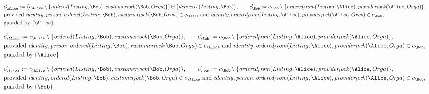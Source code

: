 \begin{align*}
&
c'_
{
\Alice
}
 := 
(c_
{
\Alice
}
 \setminus 
\{
\mathit{
ordered
}
(
Listing
,
\Bob
)
,
\mathit{
customer_lock
}
(
\Bob
,
Orga
)
\}
) \uplus 
\{
\mathit{
delivered
}
(
Listing
,
\Bob
)
\}
, \qquad 
c'_
{
\Bob
}
 := 
c_
{
\Bob
}
 \setminus 
\{
\mathit{
ordered_from
}
(
Listing
,
\Alice
)
,
\mathit{
provider_lock
}
(
\Alice
,
Orga
)
\}
,\\
&
\text{provided } 
\mathit{
identity
}
,
\mathit{
person
}
,
\mathit{
ordered
}
(
Listing
,
\Bob
)
,
\mathit{
customer_lock
}
(
\Bob
,
Orga
)
 \in c_
{
\Alice
}
 \text{ and } 
\mathit{
identity
}
,
\mathit{
ordered_from
}
(
Listing
,
\Alice
)
,
\mathit{
provider_lock
}
(
\Alice
,
Orga
)
 \in c_
{
\Bob
}
,\\
&
\text{guarded by } \{
\Alice
\}
\end{align*}

\begin{align*}
&
c'_
{
\Alice
}
 := 
c_
{
\Alice
}
 \setminus 
\{
\mathit{
ordered
}
(
Listing
,
\Bob
)
,
\mathit{
customer_lock
}
(
\Bob
,
Orga
)
\}
, \qquad 
c'_
{
\Bob
}
 := 
c_
{
\Bob
}
 \setminus 
\{
\mathit{
ordered_from
}
(
Listing
,
\Alice
)
,
\mathit{
provider_lock
}
(
\Alice
,
Orga
)
\}
,\\
&
\text{provided } 
\mathit{
identity
}
,
\mathit{
person
}
,
\mathit{
ordered
}
(
Listing
,
\Bob
)
,
\mathit{
customer_lock
}
(
\Bob
,
Orga
)
 \in c_
{
\Alice
}
 \text{ and } 
\mathit{
identity
}
,
\mathit{
ordered_from
}
(
Listing
,
\Alice
)
,
\mathit{
provider_lock
}
(
\Alice
,
Orga
)
 \in c_
{
\Bob
}
,\\
&
\text{guarded by } \{
\Alice
\}
\end{align*}

\begin{align*}
&
c'_
{
\Alice
}
 := 
c_
{
\Alice
}
 \setminus 
\{
\mathit{
ordered
}
(
Listing
,
\Bob
)
,
\mathit{
customer_lock
}
(
\Bob
,
Orga
)
\}
, \qquad 
c'_
{
\Bob
}
 := 
c_
{
\Bob
}
 \setminus 
\{
\mathit{
ordered_from
}
(
Listing
,
\Alice
)
,
\mathit{
provider_lock
}
(
\Alice
,
Orga
)
\}
,\\
&
\text{provided } 
\mathit{
identity
}
,
\mathit{
ordered
}
(
Listing
,
\Bob
)
,
\mathit{
customer_lock
}
(
\Bob
,
Orga
)
 \in c_
{
\Alice
}
 \text{ and } 
\mathit{
identity
}
,
\mathit{
person
}
,
\mathit{
ordered_from
}
(
Listing
,
\Alice
)
,
\mathit{
provider_lock
}
(
\Alice
,
Orga
)
 \in c_
{
\Bob
}
,\\
&
\text{guarded by } \{
\Bob
\}
\end{align*}
